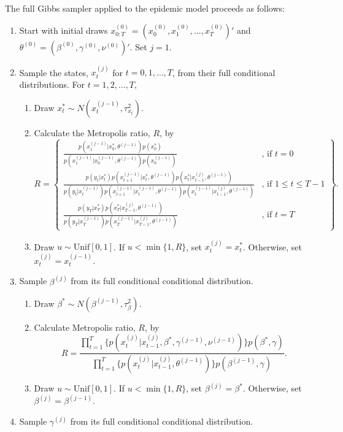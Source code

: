 The full Gibbs sampler applied to the epidemic model proceeds as follows:
\begin{enumerate}
\item Start with initial draws $x^{(0)}_{0:T} = (x^{(0)}_0, x^{(0)}_1, \ldots, x^{(0)}_T)'$ and $\theta^{(0)} = (\beta^{(0)}, \gamma^{(0)}, \nu^{(0)})'$. Set $j = 1$.
\item \label{step:gibbs} Sample the states, $x^{(j)}_t$ for $t = 0,1,\ldots,T$, from their full conditional distributions. For $t = 1, 2, \ldots, T$,
    \begin{enumerate}
    \item Draw $x^*_t \sim N(x^{(j-1)}_t,\tau^2_{x_t})$.
    \item Calculate the Metropolis ratio, $R$, by
    \[R = \left\{
    \begin{array}{cc}
    \frac{p(x^{(j-1)}_1|x^*_0,\theta^{(j-1)})p(x^*_0)}{p(x^{(j-1)}_1|x^{(j-1)}_0,\theta^{(j-1)})p(x^{(j-1)}_0)} & \mbox{, if } t = 0 \\
    \frac{p(y_t|x^*_t)p(x^{(j-1)}_{t+1}|x^*_t,\theta^{(j-1)})p(x^*_t|x^{(j)}_{t-1},\theta^{(j-1)})}{p(y_t|x^{(j-1)}_t)p(x^{(j-1)}_{t+1}|x^{(j-1)}_t,\theta^{(j-1)})p(x^{(j-1)}_t|x^{(j)}_{t-1},\theta^{(j-1)})} & \mbox{, if } 1 \le t \le T-1 \\
        \frac{p(y_T|x^*_T)p(x^*_T|x^{(j)}_{T-1},\theta^{(j-1)})}{p(y_T|x^{(j-1)}_T)p(x^{(j-1)}_T|x^{(j)}_{T-1},\theta^{(j-1)})}  & \mbox{, if } t = T
    \end{array}
    \right\}.\]
    \item Draw $u \sim \mbox{Unif}[0,1]$. If $u < \min\{1, R\}$, set $x^{(j)}_t = x^*_t$. Otherwise, set $x^{(j)}_t = x^{(j-1)}_t$.
    \end{enumerate}
\item \label{step:beta} Sample $\beta^{(j)}$ from its full conditional conditional distribution.
    \begin{enumerate}
    \item Draw $\beta^* \sim N(\beta^{(j-1)},\tau^2_{\beta})$.
    \item Calculate Metropolis ratio, $R$, by
    \[R = \frac{\prod_{t=1}^T \{p(x^{(j)}_t|x^{(j)}_{t-1},\beta^*,\gamma^{(j-1)},\nu^{(j-1)})\}p(\beta^*,\gamma)}{\prod_{t=1}^T \{p(x^{(j)}_t|x^{(j)}_{t-1},\theta^{(j-1)})\}p(\beta^{(j-1)},\gamma)}.\]
    \item Draw $u \sim \mbox{Unif}[0,1]$. If $u < \min\{1, R\}$, set $\beta^{(j)} = \beta^*$. Otherwise, set $\beta^{(j)} = \beta^{(j-1)}$.
    \end{enumerate}
\item \label{step:gamma} Sample $\gamma^{(j)}$ from its full conditional conditional distribution.

\end{enumerate}
